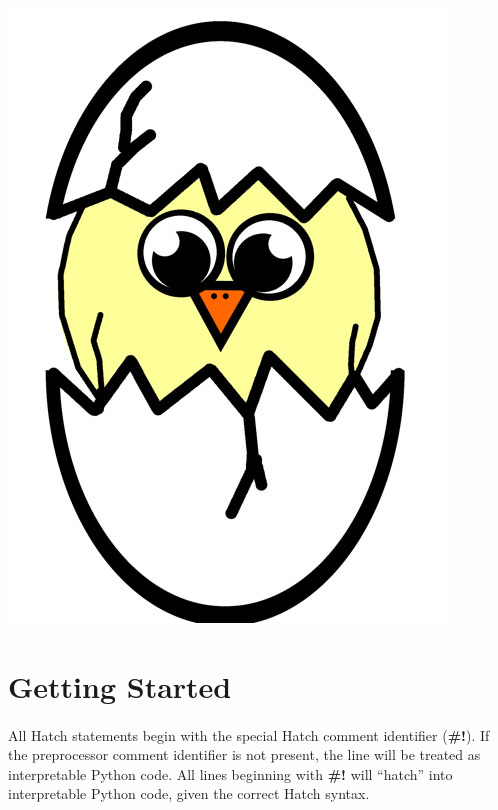 \documentclass[12pt]{article}
\begin{document}
\maketitle
\begin{center}
\includegraphics[scale=0.45]{./images/hatchchick.JPG}
\end{center}
\pagebreak

\section{Getting Started}
\paragraph{} All Hatch statements begin with the special Hatch comment identifier (\textbf{\#!}).  If the preprocessor comment identifier is not present, the line will be treated as interpretable Python code.  All lines beginning with \textbf{\#!} will ``hatch'' into interpretable Python code, given the correct Hatch syntax.
\end{document}
